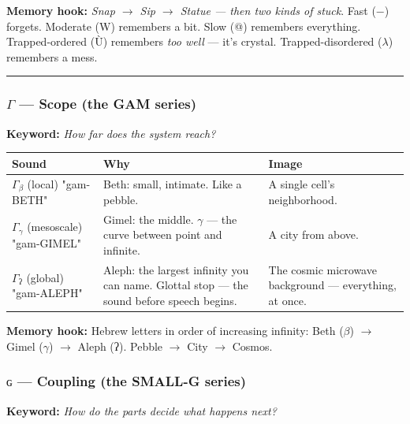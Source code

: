 \documentclass[12pt,a4paper]{article}
\begin{document}
\textbf{Memory hook:} \emph{Snap $\rightarrow$ Sip $\rightarrow$ Statue --- then two kinds of stuck}. Fast ($-$) forgets. Moderate (W) remembers a bit. Slow (@) remembers everything. Trapped-ordered (Ù) remembers \emph{too well} --- it's crystal. Trapped-disordered ($\lambda$) remembers a mess.

\begin{center}
\rule{0.5\textwidth}{0.4pt}
\end{center}

\subsubsection{$\Gamma$ --- Scope (the \textbf{GAM} series)}

\textbf{Keyword:} \emph{How far does the system reach?}

\begin{table}[htbp]
\centering
\small
{}
\begin{tabularx}{\textwidth}{>{\centering\arraybackslash}X >{\centering\arraybackslash}X >{\centering\arraybackslash}X}
\toprule
\rowcolor{gray!25}\textbf{Sound} & \textbf{Why} & \textbf{Image} \\
\midrule
\rowcolors{1}{white}{gray!10}
\textbf{$\Gamma_{\beta}$} (local) "gam-BETH" & Beth: small, intimate. Like a pebble. & A single cell's neighborhood. \\
\textbf{$\Gamma_{\gamma}$} (mesoscale) "gam-GIMEL" & Gimel: the middle. $\gamma$ --- the curve between point and infinite. & A city from above. \\
\textbf{$\Gamma_{\text{ʔ}}$} (global) "gam-ALEPH" & Aleph: the largest infinity you can name. Glottal stop --- the sound before speech begins. & The cosmic microwave background --- everything, at once. \\
\bottomrule
\end{tabularx}
\end{table}

\textbf{Memory hook:} Hebrew letters in order of increasing infinity: Beth ($\beta$) $\rightarrow$ Gimel ($\gamma$) $\rightarrow$ Aleph (ʔ). Pebble $\rightarrow$ City $\rightarrow$ Cosmos.

\subsubsection{$ɢ$ --- Coupling (the \textbf{SMALL-G} series)}

\textbf{Keyword:} \emph{How do the parts decide what happens next?}
\end{document}
